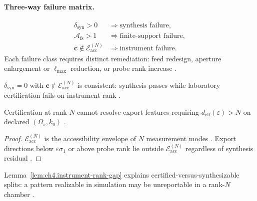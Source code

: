 \paragraph{Three-way failure matrix.}
\begin{equation}
\label{eq:ch4.failure-matrix}
\begin{aligned}
\delta_{\mathrm{syn}}>0 &\Rightarrow\text{synthesis failure},\\
\mathcal{A}_{\mathrm{fs}}>1 &\Rightarrow\text{finite-support failure},\\
\mathbf{c}\notin\mathcal{E}_{\mathrm{acc}}^{(N)} &\Rightarrow\text{instrument failure}.
\end{aligned}
\end{equation}
Each failure class requires distinct remediation: feed redesign, aperture enlargement or \(\ell_{\max}\) reduction, or probe rank increase
\cite{harrington2001,devaney2004,hansen1988,stratton1941,jackson1999,collin2001}.

\begin{corollary}
\label{cor:ch4.cert-vs-syn-split}
\(\delta_{\mathrm{syn}}=0\) with \(\mathbf{c}\notin\mathcal{E}_{\mathrm{acc}}^{(N)}\) is consistent: synthesis passes while laboratory certification fails on
instrument rank \cite{harrington2001,hansen1988,stratton1941,devaney2004}.
\end{corollary}

\begin{lemma}
\label{lem:ch4.instrument-rank-gap}
Certification at rank \(N\) cannot resolve export features requiring \(d_{\mathrm{eff}}(\varepsilon)>N\) on declared \((\Omega_{s},k_{0})\)
\cite{harrington2001,devaney2004,hansen1988,stratton1941,jackson1999}.
\end{lemma}
\begin{proof}
\(\mathcal{E}_{\mathrm{acc}}^{(N)}\) is the accessibility envelope of \(N\) measurement modes \cite{harrington2001}. Export directions below
\(\varepsilon\sigma_{1}\) or above probe rank lie outside \(\mathcal{E}_{\mathrm{acc}}^{(N)}\) regardless of synthesis residual \cite{devaney2004,hansen1988,stratton1941}.
\end{proof}

Lemma~\ref{lem:ch4.instrument-rank-gap} explains certified-versus-synthesizable splits: a pattern realizable in simulation may be unreportable in a rank-\(N\)
chamber \cite{harrington2001,jackson1999,devaney2004}.

